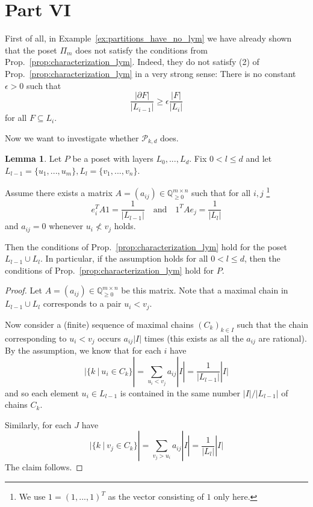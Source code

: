 \documentclass{scrartcl}
\newcommand{\Q}{\mathbb{Q}}
\theoremstyle{definition}
\newtheorem{lemma}[definition]{Lemma}
\begin{document}
\section{Part VI}
First of all, in Example~\ref{ex:partitions_have_no_lym} we have already shown that the poset $\Pi_m$ does not satisfy the conditions from Prop.~\ref{prop:characterization_lym}.
Indeed, they do not satisfy (2) of Prop.~\ref{prop:characterization_lym} in a very strong sense:
There is no constant $\epsilon > 0$ such that
\begin{equation*}
    \frac {|\partial F|} {|L_{i - 1}|} \geq \epsilon \frac {|F|} {|L_i|}
\end{equation*}
for all $F \subseteq L_i$.

Now we want to investigate whether $\mathcal{P}_{k, d}$ does. 
\begin{lemma}
    \label{prop:lp_algorithm}
    Let $P$ be a poset with layers $L_0, ..., L_d$.
    Fix $0 < l \leq d$ and let $L_{l - 1} = \{ u_1, ..., u_m \}, L_l = \{ v_1, ..., v_n \}$.

    Assume there exists a matrix $A = (a_{ij}) \in \Q_{\geq 0}^{m \times n}$ such that for all $i, j$
    \footnote{We use $1 = (1, ..., 1)^T$ as the vector consisting of $1$ only here.}
    \begin{equation*}
        e_i^T A 1 = \frac 1 {|L_{l - 1}|} \quad \text{and} \quad 1^T A e_j = \frac 1 {|L_l|}
    \end{equation*}
    and $a_{ij} = 0$ whenever $u_i \not< v_j$ holds.

    Then the conditions of Prop.~\ref{prop:characterization_lym} hold for the poset $L_{l - 1} \cup L_l$.
    In particular, if the assumption holds for all $0 < l \leq d$, then the conditions of Prop.~\ref{prop:characterization_lym} hold for $P$.
\end{lemma}
\begin{proof}
    Let $A = (a_{ij}) \in \Q_{\geq 0}^{m \times n}$ be this matrix.
    Note that a maximal chain in $L_{l - 1} \cup L_l$ corresponds to a pair $u_i < v_j$.

    Now consider a (finite) sequence of maximal chains $(C_k)_{k \in I}$ such that the chain corresponding to $u_i < v_j$ occurs $a_{ij} |I|$ times (this exists as all the $a_{ij}$ are rational).
    By the assumption, we know that for each $i$ have
    \begin{equation*}
        |\{k \ | \ u_i \in C_k\}| = \sum_{u_i < v_j} a_{ij}|I| = \frac 1 {|L_{l - 1}|} |I|
    \end{equation*}
    and so each element $u_i \in L_{l - 1}$ is contained in the same number $|I| / |L_{l - 1}|$ of chains $C_k$.

    Similarly, for each $J$ have
    \begin{equation*}
        |\{k \ | \ v_j \in C_k\}| = \sum_{v_j > u_i} a_{ij}|I| = \frac 1 {|L_l|} |I|
    \end{equation*}
    The claim follows.
\end{proof}
\end{document}
